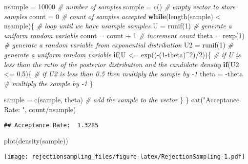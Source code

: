 \documentclass[
]{article}
\newenvironment{Shaded}{\begin{snugshade}}{\end{snugshade}}
\newcommand{\CommentTok}[1]{\textcolor[rgb]{0.56,0.35,0.01}{\textit{#1}}}
\newcommand{\ControlFlowTok}[1]{\textcolor[rgb]{0.13,0.29,0.53}{\textbf{#1}}}
\newcommand{\DecValTok}[1]{\textcolor[rgb]{0.00,0.00,0.81}{#1}}
\newcommand{\FloatTok}[1]{\textcolor[rgb]{0.00,0.00,0.81}{#1}}
\newcommand{\FunctionTok}[1]{\textcolor[rgb]{0.00,0.00,0.00}{#1}}
\newcommand{\NormalTok}[1]{#1}
\newcommand{\OtherTok}[1]{\textcolor[rgb]{0.56,0.35,0.01}{#1}}
\newcommand{\SpecialCharTok}[1]{\textcolor[rgb]{0.00,0.00,0.00}{#1}}
\newcommand{\StringTok}[1]{\textcolor[rgb]{0.31,0.60,0.02}{#1}}
\begin{document}
\begin{Shaded}
\begin{Highlighting}[]
\NormalTok{nsample }\OtherTok{=} \DecValTok{10000}                     \CommentTok{\# number of samples}
\NormalTok{sample }\OtherTok{=} \FunctionTok{c}\NormalTok{()                        }\CommentTok{\# empty vector to store samples}
\NormalTok{count }\OtherTok{=} \DecValTok{0}                           \CommentTok{\# count of samples accepted}
\ControlFlowTok{while}\NormalTok{(}\FunctionTok{length}\NormalTok{(sample) }\SpecialCharTok{\textless{}}\NormalTok{ nsample)\{    }\CommentTok{\# loop until we have nsample samples}
\NormalTok{  U }\OtherTok{=} \FunctionTok{runif}\NormalTok{(}\DecValTok{1}\NormalTok{)                      }\CommentTok{\# generate a uniform random variable}
\NormalTok{  count }\OtherTok{=}\NormalTok{ count }\SpecialCharTok{+} \DecValTok{1}                 \CommentTok{\# increment count}
\NormalTok{  theta }\OtherTok{=} \FunctionTok{rexp}\NormalTok{(}\DecValTok{1}\NormalTok{)                   }\CommentTok{\# generate a random variable from exponential distribution}
\NormalTok{  U2 }\OtherTok{=} \FunctionTok{runif}\NormalTok{(}\DecValTok{1}\NormalTok{)                     }\CommentTok{\# generate a uniform random variable}
  \ControlFlowTok{if}\NormalTok{(U }\SpecialCharTok{\textless{}=} \FunctionTok{exp}\NormalTok{((}\SpecialCharTok{{-}}\NormalTok{(}\DecValTok{1}\SpecialCharTok{{-}}\NormalTok{theta)}\SpecialCharTok{\^{}}\DecValTok{2}\NormalTok{)}\SpecialCharTok{/}\DecValTok{2}\NormalTok{))\{ }\CommentTok{\# if U is less than the ratio of the posterior distribution and the candidate density}
    \ControlFlowTok{if}\NormalTok{(U2 }\SpecialCharTok{\textless{}=} \FloatTok{0.5}\NormalTok{)\{                  }\CommentTok{\# if U2 is less than 0.5 then multiply the sample by {-}1}
\NormalTok{      theta }\OtherTok{=} \SpecialCharTok{{-}}\NormalTok{theta                }\CommentTok{\# multiply the sample by {-}1}
\NormalTok{    \}}
    
\NormalTok{    sample }\OtherTok{=} \FunctionTok{c}\NormalTok{(sample, theta)       }\CommentTok{\# add the sample to the vector}
\NormalTok{  \}}
\NormalTok{\}}
\FunctionTok{cat}\NormalTok{(}\StringTok{"Acceptance Rate: "}\NormalTok{, count}\SpecialCharTok{/}\NormalTok{nsample)}
\end{Highlighting}
\end{Shaded}

\begin{verbatim}
## Acceptance Rate:  1.3285
\end{verbatim}

\begin{Shaded}
\begin{Highlighting}[]
\FunctionTok{plot}\NormalTok{(}\FunctionTok{density}\NormalTok{(sample))}
\end{Highlighting}
\end{Shaded}

\texttt{[image: rejectionsampling\_files/figure-latex/RejectionSampling-1.pdf]}
\end{document}
